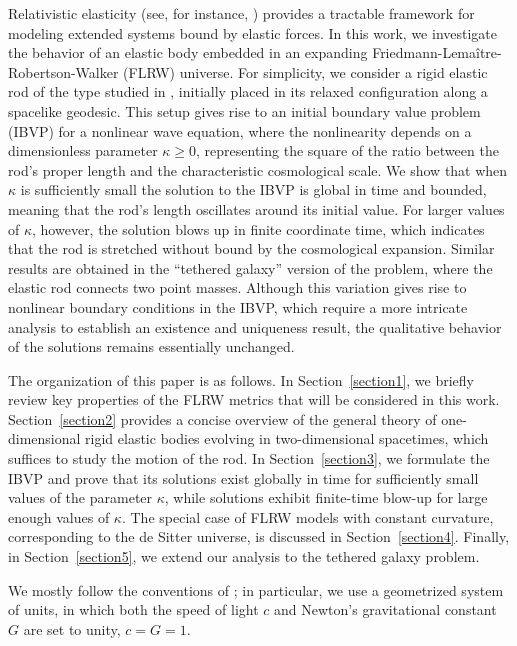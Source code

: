 \documentclass[10pt]{amsart}
\begin{document}
Relativistic elasticity (see, for instance, \cite{BS03, KS04, Beig23}) provides a tractable framework for modeling extended systems bound by elastic forces. In this work, we investigate the behavior of an elastic body embedded in an expanding Friedmann-Lemaître-Robertson-Walker (FLRW) universe. For simplicity, we consider a rigid elastic rod of the type studied in \cite{Natario14, NQV18, CN19, MNS24}, initially placed in its relaxed configuration along a spacelike geodesic.
%
This setup gives rise to an initial boundary value problem (IBVP) for a nonlinear wave equation, where the nonlinearity depends on a dimensionless parameter $\kappa \geq 0$, representing the square of the ratio between the rod's proper length and the characteristic cosmological scale. We show that when $\kappa$ is sufficiently small the solution to the IBVP is global in time and bounded, meaning that the rod's length oscillates around its initial value. For larger values of $\kappa$, however, the solution blows up in finite coordinate time, which indicates that the rod is stretched without bound by the cosmological expansion.
%
Similar results are obtained in the ``tethered galaxy'' version of the problem, where the elastic rod connects two point masses. Although this variation gives rise to nonlinear boundary conditions in the IBVP, which require a more intricate analysis to establish an existence and uniqueness result, the qualitative behavior of the solutions remains essentially unchanged.

The organization of this paper is as follows. In Section~\ref{section1}, we briefly review key properties of the FLRW metrics that will be considered in this work. Section~\ref{section2} provides a concise overview of the general theory of one-dimensional rigid elastic bodies evolving in two-dimensional spacetimes, which suffices to study the motion of the rod. In Section~\ref{section3}, we formulate the IBVP and prove that its solutions exist globally in time for sufficiently small values of the parameter $\kappa$, while solutions exhibit finite-time blow-up for large enough values of $\kappa$. The special case of FLRW models with constant curvature, corresponding to the de Sitter universe, is discussed in Section~\ref{section4}. Finally, in Section~\ref{section5}, we extend our analysis to the tethered galaxy problem.

We mostly follow the conventions of \cite{MTW73}; in particular, we use a geometrized system of units, in which both the speed of light $c$ and Newton's gravitational constant $G$ are set to unity, $c=G=1$.
%
%
%
\end{document}
